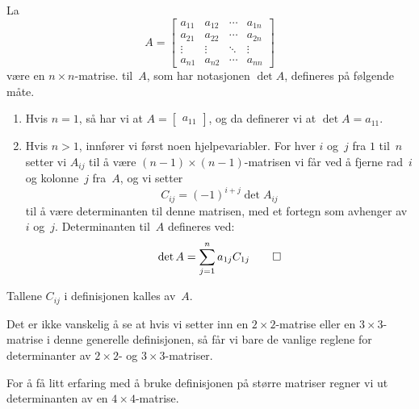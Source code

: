 \begin{defn}
La
\[
A =
\begin{bmatrix}
a_{11} & a_{12} & \cdots & a_{1n} \\
a_{21} & a_{22} & \cdots & a_{2n} \\
\vdots & \vdots & \ddots & \vdots \\
a_{n1} & a_{n2} & \cdots & a_{nn}
\end{bmatrix}
\]
være en $n \times n$-matrise.   til~$A$, som
har notasjonen $\det A$, defineres på følgende måte.
\begin{enumerate}
\item Hvis $n = 1$, så har vi at
$A = \begin{bmatrix} a_{11} \end{bmatrix}$, og da definerer vi at
$\det A = a_{11}$.
\item Hvis $n > 1$, innfører vi først noen hjelpevariabler.  For hver
$i$ og~$j$ fra $1$ til~$n$ setter vi $A_{ij}$ til å være
$(n-1) \times (n-1)$-matrisen vi får ved å fjerne rad~$i$ og
kolonne~$j$ fra~$A$, og vi setter
\[
C_{ij} = (-1)^{i + j} \det A_{ij}
\]
til å være determinanten til denne matrisen, med et fortegn som
avhenger av $i$ og~$j$.  Determinanten til~$A$ defineres ved:
\[
\det A = \sum_{j=1}^n a_{1j} C_{1j}\qedhere
\]
\end{enumerate}
\end{defn}

Tallene $C_{ij}$ i definisjonen kalles  av~$A$.

Det er ikke vanskelig å se at hvis vi setter inn en
$2 \times 2$-matrise eller en $3 \times 3$-matrise i denne generelle
definisjonen, så får vi bare de vanlige reglene for determinanter av
$2 \times 2$- og $3 \times 3$-matriser.

For å få litt erfaring med å bruke definisjonen på større matriser
regner vi ut determinanten av en $4 \times 4$-matrise.

